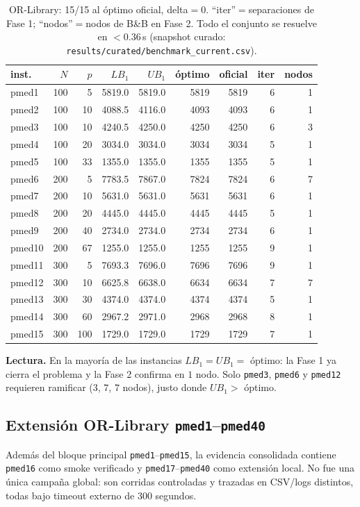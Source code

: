 \begin{table}[h]\centering\small
\begin{tabular}{lrrrrrrrr}
\toprule
inst. & $N$ & $p$ & $LB_1$ & $UB_1$ & óptimo & oficial & iter & nodos \\
\midrule
pmed1  & 100 & 5   & 5819.0 & 5819.0 & 5819 & 5819 & 6 & 1 \\
pmed2  & 100 & 10  & 4088.5 & 4116.0 & 4093 & 4093 & 6 & 1 \\
pmed3  & 100 & 10  & 4240.5 & 4250.0 & 4250 & 4250 & 6 & 3 \\
pmed4  & 100 & 20  & 3034.0 & 3034.0 & 3034 & 3034 & 5 & 1 \\
pmed5  & 100 & 33  & 1355.0 & 1355.0 & 1355 & 1355 & 5 & 1 \\
pmed6  & 200 & 5   & 7783.5 & 7867.0 & 7824 & 7824 & 6 & 7 \\
pmed7  & 200 & 10  & 5631.0 & 5631.0 & 5631 & 5631 & 6 & 1 \\
pmed8  & 200 & 20  & 4445.0 & 4445.0 & 4445 & 4445 & 5 & 1 \\
pmed9  & 200 & 40  & 2734.0 & 2734.0 & 2734 & 2734 & 6 & 1 \\
pmed10 & 200 & 67  & 1255.0 & 1255.0 & 1255 & 1255 & 9 & 1 \\
pmed11 & 300 & 5   & 7693.3 & 7696.0 & 7696 & 7696 & 9 & 1 \\
pmed12 & 300 & 10  & 6625.8 & 6638.0 & 6634 & 6634 & 7 & 7 \\
pmed13 & 300 & 30  & 4374.0 & 4374.0 & 4374 & 4374 & 5 & 1 \\
pmed14 & 300 & 60  & 2967.2 & 2971.0 & 2968 & 2968 & 8 & 1 \\
pmed15 & 300 & 100 & 1729.0 & 1729.0 & 1729 & 1729 & 7 & 1 \\
\bottomrule
\end{tabular}
\caption{OR-Library: 15/15 al óptimo oficial, delta$=0$. ``iter''$=$separaciones de Fase 1;
``nodos''$=$nodos de B\&B en Fase 2. Todo el conjunto se resuelve en $<0.36$\,s
(snapshot curado: \texttt{results/curated/benchmark\_current.csv}).}
\label{tab:orlib}
\end{table}

\textbf{Lectura.} En la mayoría de las instancias $LB_1=UB_1=$ óptimo: la Fase 1 ya cierra el
problema y la Fase 2 confirma en $1$ nodo. Solo \texttt{pmed3}, \texttt{pmed6} y \texttt{pmed12}
requieren ramificar ($3$, $7$, $7$ nodos), justo donde $UB_1>$ óptimo.

\subsection{Extensión OR-Library \texttt{pmed1}--\texttt{pmed40}}
Además del bloque principal \texttt{pmed1}--\texttt{pmed15}, la evidencia consolidada contiene
\texttt{pmed16} como smoke verificado y \texttt{pmed17}--\texttt{pmed40} como extensión local. No
fue una única campaña global: son corridas controladas y trazadas en CSV/logs distintos, todas
bajo timeout externo de 300 segundos.

